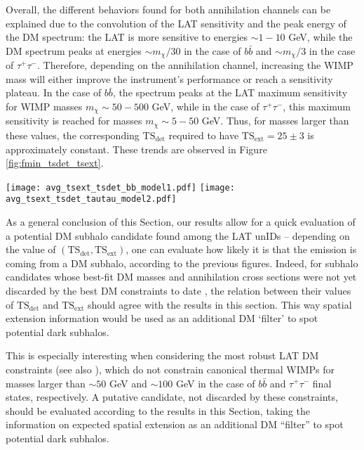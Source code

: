 \documentclass[%
 reprint,
nofootinbib,
 amsmath,amssymb,
 aps,
]{revtex4-2}
\begin{document}
Overall, the different behaviors found for both annihilation channels can be explained due to the convolution of the LAT sensitivity and the peak energy of the DM spectrum: the LAT is more sensitive to energies $\sim1-10$ GeV, while the DM spectrum peaks at energies $\sim m_{\chi}/30$ in the case of $b\bar{b}$ and $\sim m_{\chi}/3$ in the case of $\tau^+\tau^-$. Therefore, depending on the annihilation channel, increasing the WIMP mass will either improve the instrument's performance or reach a sensitivity plateau. In the case of $b\bar{b}$, the spectrum peaks at the LAT maximum sensitivity for WIMP masses $m_{\chi}\sim50-500$ GeV, while in the case of $\tau
^+\tau^-$, this maximum sensitivity is reached for masses $m_{\chi}\sim5-50$ GeV. Thus, for masses larger than these values, the corresponding $\mathrm{TS_{det}}$ required to have $\mathrm{TS_{ext}=25\pm3}$ is approximately constant. These trends are observed in Figure \ref{fig:fmin_tsdet_tsext}.

\begin{figure*}[!ht]
\centering
\texttt{[image: avg\_tsext\_tsdet\_bb\_model1.pdf]}
\texttt{[image: avg\_tsext\_tsdet\_tautau\_model2.pdf]}
\caption{Comparison between the TS of detection ($\mathrm{TS_{det}}$) and TS of extension ($\mathrm{TS_{ext}}$) for the case of achieving $F_{min}^{ext}$, i.e., $\mathrm{TS_{ext}}=25$ (we use a tolerance of $\pm3$), {  as a function of the mass of the DM candidate}. Left panel shows the results for $b\bar{b}$ and right panel for $\tau^+\tau^-$ annihilation channel.}
\label{fig:fmin_tsdet_tsext}
\end{figure*}

As a general conclusion of this Section, our results allow for a quick evaluation of a potential DM subhalo candidate found among the LAT unIDs -- depending on the value of $\mathrm{(TS_{det}, TS_{ext})}$, one can evaluate how likely it is that the emission is coming from a DM subhalo, according to the previous figures. {  Indeed, for subhalo candidates whose best-fit DM masses and annihilation cross sections were not yet discarded by the best DM constraints to date \cite{2017ApJ...834..110A,Di_Mauro_2021}, the relation between their values of $\mathrm{TS_{det}}$ and $\mathrm{TS_{ext}}$ should agree with the results in this section. This way spatial extension information would be used as an additional DM `filter' to spot potential dark subhalos.}

This is especially interesting when considering the most robust LAT DM constraints \cite{2017ApJ...834..110A} (see also \cite{Di_Mauro_2021}), which do not constrain canonical thermal WIMPs for masses larger than $\sim50$ GeV and $\sim100$ GeV in the case of $b\bar{b}$ and $\tau^+\tau^-$ final states, respectively. A putative candidate, not discarded by these constraints, should be evaluated according to the results in this Section, taking the information on expected spatial extension as an additional DM ``filter'' to spot potential dark subhalos.
\end{document}
